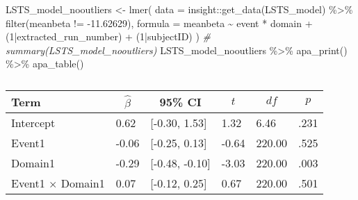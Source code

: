 \documentclass[
]{article}
\newenvironment{Shaded}{\begin{snugshade}}{\end{snugshade}}
\newcommand{\AttributeTok}[1]{\textcolor[rgb]{0.77,0.63,0.00}{#1}}
\newcommand{\CommentTok}[1]{\textcolor[rgb]{0.56,0.35,0.01}{\textit{#1}}}
\newcommand{\DecValTok}[1]{\textcolor[rgb]{0.00,0.00,0.81}{#1}}
\newcommand{\FloatTok}[1]{\textcolor[rgb]{0.00,0.00,0.81}{#1}}
\newcommand{\FunctionTok}[1]{\textcolor[rgb]{0.00,0.00,0.00}{#1}}
\newcommand{\NormalTok}[1]{#1}
\newcommand{\OtherTok}[1]{\textcolor[rgb]{0.56,0.35,0.01}{#1}}
\newcommand{\SpecialCharTok}[1]{\textcolor[rgb]{0.00,0.00,0.00}{#1}}
\begin{document}
\begin{Shaded}
\begin{Highlighting}[]
\NormalTok{LSTS\_model\_nooutliers }\OtherTok{\textless{}{-}} \FunctionTok{lmer}\NormalTok{(}
      \AttributeTok{data =}\NormalTok{ insight}\SpecialCharTok{::}\FunctionTok{get\_data}\NormalTok{(LSTS\_model) }\SpecialCharTok{\%\textgreater{}\%}
        \FunctionTok{filter}\NormalTok{(meanbeta }\SpecialCharTok{!=} \SpecialCharTok{{-}}\FloatTok{11.62629}\NormalTok{),}
      \AttributeTok{formula =}\NormalTok{ meanbeta }\SpecialCharTok{\textasciitilde{}}\NormalTok{ event }\SpecialCharTok{*}\NormalTok{ domain }\SpecialCharTok{+}\NormalTok{ (}\DecValTok{1}\SpecialCharTok{|}\NormalTok{extracted\_run\_number) }\SpecialCharTok{+}\NormalTok{ (}\DecValTok{1}\SpecialCharTok{|}\NormalTok{subjectID)}
\NormalTok{    )}
\CommentTok{\# summary(LSTS\_model\_nooutliers)}
\NormalTok{LSTS\_model\_nooutliers }\SpecialCharTok{\%\textgreater{}\%}
  \FunctionTok{apa\_print}\NormalTok{() }\SpecialCharTok{\%\textgreater{}\%}
  \FunctionTok{apa\_table}\NormalTok{()}
\end{Highlighting}
\end{Shaded}

\begin{table}[tbp]

\begin{center}
\begin{threeparttable}

\caption{\label{tab:unnamed-chunk-14}}

\begin{tabular}{llllll}
\toprule
Term & \multicolumn{1}{c}{$\hat{\beta}$} & \multicolumn{1}{c}{95\% CI} & \multicolumn{1}{c}{$t$} & \multicolumn{1}{c}{$\mathit{df}$} & \multicolumn{1}{c}{$p$}\\
\midrule
Intercept & 0.62 & {}[-0.30, 1.53] & 1.32 & 6.46 & .231\\
Event1 & -0.06 & {}[-0.25, 0.13] & -0.64 & 220.00 & .525\\
Domain1 & -0.29 & {}[-0.48, -0.10] & -3.03 & 220.00 & .003\\
Event1 $\times$ Domain1 & 0.07 & {}[-0.12, 0.25] & 0.67 & 220.00 & .501\\
\bottomrule
\end{tabular}

\end{threeparttable}
\end{center}

\end{table}
\end{document}
